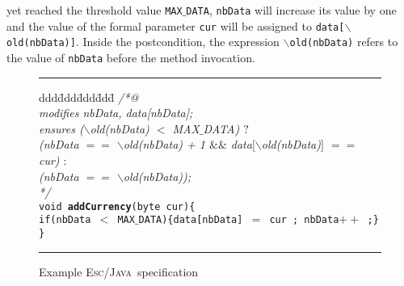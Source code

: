 \documentclass[a4paper]{llncs}
\newcommand{\escj}{\textsc{Esc/Java}}
\begin{document}
yet reached the threshold value \texttt{MAX$\_$DATA}, \texttt{nbData} 
will increase its value by one and the value of the formal parameter 
\texttt{cur} will be assigned to \texttt{data[\(\backslash\)old(nbData)]}.  
Inside the postcondition, the expression 
\texttt{$\backslash$old(nbData)} refers to the value of 
\texttt{nbData} before the method invocation. 
\begin{figure}[htb]
\rule{\linewidth}{0.25mm}
\begin{tabbing}
ddd\=ddd\=ddd\=ddd\= \kill 
\textsl{/*@} \\
\>\textsl{modifies nbData, data[nbData];}  \\
\>\textsl{ensures ($\backslash$old(nbData) $<$ MAX$\_$DATA) $?$}  \\
\>\>\>\textsl{(nbData $==$ $\backslash$old(nbData) + 1 $\&\&$ data$[\backslash$old(nbData)$]$ $==$ cur) $:$}  \\
\>\>\>\textsl{(nbData $==$ $\backslash$old(nbData));}  \\
\textsl{*/} \\
\texttt{void {\bf addCurrency}(byte cur)\{ } \\
\>\texttt{if(nbData $<$ MAX$\_$DATA)\{data[nbData] $=$ cur ; nbData$++$ ;\}}  \\
\texttt{\}}
\end{tabbing}
\caption{Example \escj~specification} 
\label{fig-add-cur} 
\rule{\linewidth}{0.25mm} 
\end{figure} 
\end{document}
